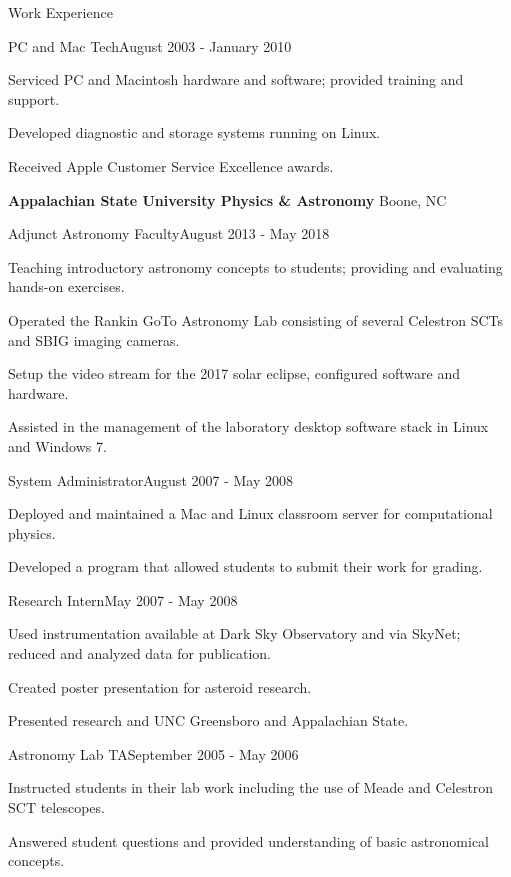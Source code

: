 \documentclass{new_cv} %
\begin{document}
\begin{rSection}{Work Experience}
         \begin{rSubsection}{PC and Mac Tech}{August 2003 - January 2010}
   \item Serviced PC and Macintosh hardware and software; provided training and support.
   \item Developed diagnostic and storage systems running on Linux.
   \item Received Apple Customer Service Excellence awards.
   \end{rSubsection}
   
     {\bf {Appalachian State University Physics \& Astronomy}} \hfill { Boone, NC}
   
          \begin{rSubsection}{Adjunct Astronomy Faculty}{August 2013 - May 2018}
           \item Teaching introductory astronomy concepts to students; providing and evaluating hands-on exercises.
          \item Operated the Rankin GoTo Astronomy Lab consisting of several Celestron SCTs and SBIG imaging cameras.
\item Setup the video stream for the 2017 solar eclipse, configured software and hardware.
\item Assisted in the management of the laboratory desktop software stack in Linux and Windows 7.
   \end{rSubsection}
   
      \begin{rSubsection}{System Administrator}{August 2007 - May 2008}
   	\item Deployed and maintained a Mac and Linux classroom server for computational physics.
   	\item Developed a program that allowed students to submit their work for grading.
   \end{rSubsection}
   
     \begin{rSubsection}{Research Intern}{May 2007 - May 2008}
   	\item Used instrumentation available at Dark Sky Observatory and via SkyNet; reduced and analyzed data for publication.
   	\item Created poster presentation for asteroid research.
   	\item Presented research and UNC Greensboro and Appalachian State.
   \end{rSubsection}
   
        \begin{rSubsection}{Astronomy Lab TA}{September 2005 - May 2006}
   	\item Instructed students in their lab work including the use of Meade and Celestron SCT telescopes.
   	\item Answered student questions and provided understanding of basic astronomical concepts.
   \end{rSubsection}
  

\end{rSection}
\end{document}
